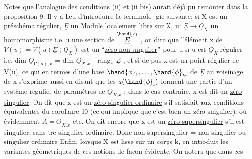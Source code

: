 \margin{$\Vert$} Notes que l'analogue des conditions (ii) et (ii bis) aurait déjà
pu remonter dans la proposition 9. Il y a lieu d'introduire la terminolo-%
gie suivante: si X est un préschéma régulier, $\underline{E}$ un Module localement libre
 sur X, u: $\underline{E}\to\underline{O}_X$ un homomorphisme i.e. u une section de
$\overset{\hand{\scriptscriptstyle\vee}}{\underline{E}}$ , on dira que l'élément x de $V(u)=V(u(\underline{E})\underline{O}_X)$ est un 
``\uline{zéro non singulier}'' pour u\hand{,} si u est $\underline{O}_X$-régulier i.e. dim $\underline{O}_{V(u),x}$
= dim $\underline{O}_{X,x}$ - rang$_x$ $\underline{E}$ , et si de pus x est un point régulier de V(u),
ce qui en termes d'une base $\hand{\phi}_1,\ldots,\hand{\phi}_m$ de $\underline{E}$ au voisinage de x s'exprime
aussi en disant que les $u(\hand{\phi}_i)$ forment une partie d'un systême régulier
de paramètres de $\underline{O}_{X,x}$ ; dans le cas contraire, x est dit un \uline{zéro}
\uline{singulier}. On dit que x est un \uline{zéro singulier ordinaire} s'il satisfait
aux conditions équivalentes du corollaire 10 (ce qui implique que c'est
bien un zéro singulier), où évidemment $A=\underline{O}_{X,x}$ etc. On dit encore que
x est un \uline{zéro supersingulier} s'il est singulier, sans \hand{\^{\textcolor{black}{e}}}tre singulier
ordinaire. Donc non supersingulier\margin{\unsure{$\smallsmile$}} = non singulier ou singulier ordinaire
Enfin, lorsque X est lisse sur un corps k, on introduit les variantes
géométriques de ces notions de façon évidente. On notera que dans ces

